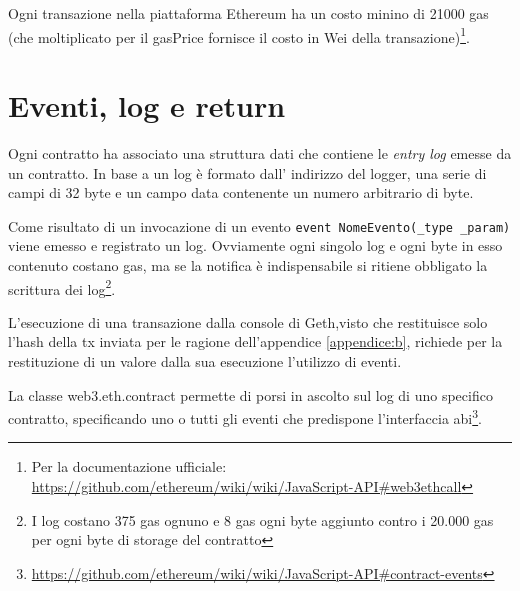 \begin{appendices}
	Ogni transazione nella piattaforma Ethereum ha un costo minino di 21000 gas (che moltiplicato per il gasPrice fornisce il costo in Wei della transazione)\footnote{ Per la documentazione ufficiale: \url{https://github.com/ethereum/wiki/wiki/JavaScript-API\#web3ethcall}}.
	
	\section{Eventi, log e return}\label{appendice:d}

	Ogni contratto ha associato una struttura dati che contiene le \textit{entry log} emesse da un contratto. In base a \cite{yellowpaperethereum} un log è formato dall' indirizzo del logger, una serie di campi di 32 byte e un campo data contenente un numero arbitrario di byte.
	
	Come risultato di un invocazione di un evento \lstinline|event NomeEvento(_type _param)| viene emesso e registrato un log. Ovviamente ogni singolo log e ogni byte in esso contenuto costano gas, ma se la notifica è indispensabile si ritiene obbligato la scrittura dei log\footnote{I log costano 375 gas ognuno e 8 gas ogni byte aggiunto contro i 20.000 gas per ogni byte di storage del contratto}.
	
	L'esecuzione di una transazione dalla console di Geth,visto che restituisce solo l'hash della tx inviata per le ragione dell'appendice \ref{appendice:b}, richiede per la restituzione di un valore dalla sua esecuzione l'utilizzo di eventi.
	
	La classe web3.eth.contract permette di porsi in ascolto sul log di uno specifico contratto, specificando uno o tutti gli eventi che predispone l'interfaccia abi\footnote{	\url{https://github.com/ethereum/wiki/wiki/JavaScript-API\#contract-events}}.
	
	\iffalse
	using a callback is just calling the RPC method asynchronously and will return the same as the sync function. On the RPC side there is no way to get a notification whether the tx was mined or not. you would need to check that yourself with a script looking at the next block.
	We could think of integrating this into web3.js, but thats out of scope for now.
	\fi

\end{appendices}